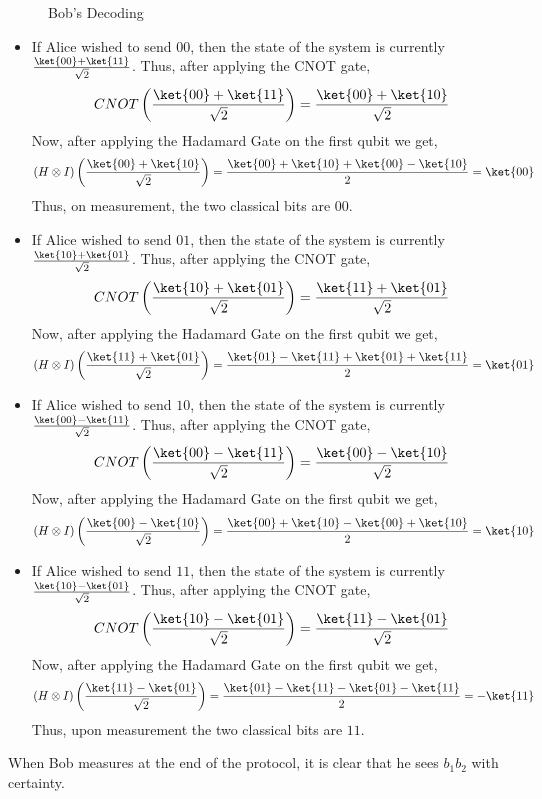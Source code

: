\documentclass[12pt, oneside]{book}
\theoremstyle{definition}
\theoremstyle{definition}
\theoremstyle{remark}
\begin{document}
\begin{enumerate}
\begin{figure}[H]
        \caption{Bob's Decoding}
        \label{fig:superdense3}
    \end{figure}
    \begin{itemize}
        \item If Alice wished to send $00$, then the state of the system is currently $\frac{\ket{00}+\ket{11}}{\sqrt{2}}$. Thus, after applying the CNOT gate,
        \[
            CNOT\left(\frac{\ket{00}+\ket{11}}{\sqrt{2}}\right)=\frac{\ket{00}+\ket{10}}{\sqrt{2}}
        \]
        Now, after applying the Hadamard Gate on the first qubit we get,
        \[
            (H \otimes I)\left(\frac{\ket{00}+\ket{10}}{\sqrt{2}}\right)=\frac{\ket{00}+\ket{10}+\ket{00}-\ket{10}}{2}=\ket{00}
        \]
        Thus, on measurement, the two classical bits are $00$.
        \item If Alice wished to send $01$, then the state of the system is currently $\frac{\ket{10}+\ket{01}}{\sqrt{2}}$. Thus, after applying the CNOT gate,
        \[
            CNOT\left(\frac{\ket{10}+\ket{01}}{\sqrt{2}}\right)=\frac{\ket{11}+\ket{01}}{\sqrt{2}}
        \]
        Now, after applying the Hadamard Gate on the first qubit we get,
        \[
            (H\otimes I)\left(\frac{\ket{11}+\ket{01}}{\sqrt{2}}\right)=\frac{\ket{01}-\ket{11}+\ket{01}+\ket{11}}{2}=\ket{01}
        \]
        \item If Alice wished to send $10$, then the state of the system is currently $\frac{\ket{00}-\ket{11}}{\sqrt{2}}$. Thus, after applying the CNOT gate,
        \[
            CNOT\left(\frac{\ket{00}-\ket{11}}{\sqrt{2}}\right)=\frac{\ket{00}-\ket{10}}{\sqrt{2}}
        \]
        Now, after applying the Hadamard Gate on the first qubit we get,
        \[
            (H\otimes I)\left(\frac{\ket{00}-\ket{10}}{\sqrt{2}}\right)=\frac{\ket{00}+\ket{10}-\ket{00}+\ket{10}}{2}=\ket{10}
        \]
        \item If Alice wished to send $11$, then the state of the system is currently $\frac{\ket{10}-\ket{01}}{\sqrt{2}}$. Thus, after applying the CNOT gate,
        \[
            CNOT\left(\frac{\ket{10}-\ket{01}}{\sqrt{2}}\right)=\frac{\ket{11}-\ket{01}}{\sqrt{2}}
        \]
        Now, after applying the Hadamard Gate on the first qubit we get,
        \[
            (H\otimes I)\left(\frac{\ket{11}-\ket{01}}{\sqrt{2}}\right)=\frac{\ket{01}-\ket{11}-\ket{01}-\ket{11}}{2}=-\ket{11}
        \]
        Thus, upon measurement the two classical bits are $11$.
    \end{itemize}
    When Bob measures at the end of the protocol, it is clear that he sees $b_1b_2$ with certainty.
\end{enumerate}
\end{document}
